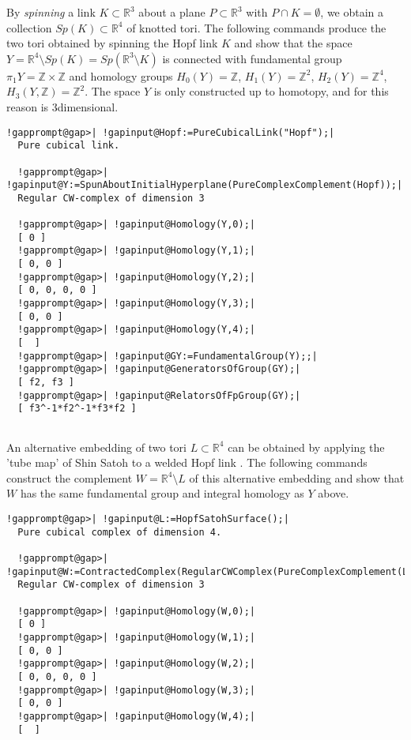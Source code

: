\documentclass[a4paper,11pt]{report}
\begin{document}
{{By \emph{spinning} a link $K \subset \mathbb R^3$ about a plane $ P\subset \mathbb R^3$ with $P\cap K=\emptyset$, we obtain a collection $Sp(K)\subset \mathbb R^4$ of knotted tori. The following commands produce the two tori obtained by
spinning the Hopf link $K$ and show that the space $Y=\mathbb R^4\setminus Sp(K) = Sp(\mathbb R^3\setminus K)$ is connected with fundamental group $\pi_1Y = \mathbb Z\times \mathbb Z$ and homology groups $H_0(Y)=\mathbb Z$, $H_1(Y)=\mathbb Z^2$, $H_2(Y)=\mathbb Z^4$, $H_3(Y,\mathbb Z)=\mathbb Z^2$. The space $Y$ is only constructed up to homotopy, and for this reason is $3$\texttt{}dimensional. 
\begin{Verbatim}[commandchars=!@|,fontsize=\small,frame=single,label=Example]
  !gapprompt@gap>| !gapinput@Hopf:=PureCubicalLink("Hopf");|
  Pure cubical link.
  
  !gapprompt@gap>| !gapinput@Y:=SpunAboutInitialHyperplane(PureComplexComplement(Hopf));|
  Regular CW-complex of dimension 3
  
  !gapprompt@gap>| !gapinput@Homology(Y,0);|
  [ 0 ]
  !gapprompt@gap>| !gapinput@Homology(Y,1);|
  [ 0, 0 ]
  !gapprompt@gap>| !gapinput@Homology(Y,2);|
  [ 0, 0, 0, 0 ]
  !gapprompt@gap>| !gapinput@Homology(Y,3);|
  [ 0, 0 ]
  !gapprompt@gap>| !gapinput@Homology(Y,4);|
  [  ]
  !gapprompt@gap>| !gapinput@GY:=FundamentalGroup(Y);;|
  !gapprompt@gap>| !gapinput@GeneratorsOfGroup(GY);|
  [ f2, f3 ]
  !gapprompt@gap>| !gapinput@RelatorsOfFpGroup(GY);|
  [ f3^-1*f2^-1*f3*f2 ]
  
\end{Verbatim}
 

An alternative embedding of two tori $L\subset \mathbb R^4 $ can be obtained by applying the 'tube map' of Shin Satoh to a welded Hopf link \cite{MR1758871}. The following commands construct the complement $W=\mathbb R^4\setminus L$ of this alternative embedding and show that $W $ has the same fundamental group and integral homology as $Y$ above. 
\begin{Verbatim}[commandchars=!@|,fontsize=\small,frame=single,label=Example]
  !gapprompt@gap>| !gapinput@L:=HopfSatohSurface();|
  Pure cubical complex of dimension 4.
  
  !gapprompt@gap>| !gapinput@W:=ContractedComplex(RegularCWComplex(PureComplexComplement(L)));|
  Regular CW-complex of dimension 3
  
  !gapprompt@gap>| !gapinput@Homology(W,0);|
  [ 0 ]
  !gapprompt@gap>| !gapinput@Homology(W,1);|
  [ 0, 0 ]
  !gapprompt@gap>| !gapinput@Homology(W,2);|
  [ 0, 0, 0, 0 ]
  !gapprompt@gap>| !gapinput@Homology(W,3);|
  [ 0, 0 ]
  !gapprompt@gap>| !gapinput@Homology(W,4);|
  [  ]
  

\end{Verbatim}}}
\end{document}
